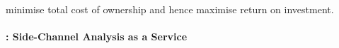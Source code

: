 %
%
%
%

 minimise total cost of ownership
and hence maximise return on investment.


\paragraph{\SCAAAS: Side-Channel Analysis as a Service}


